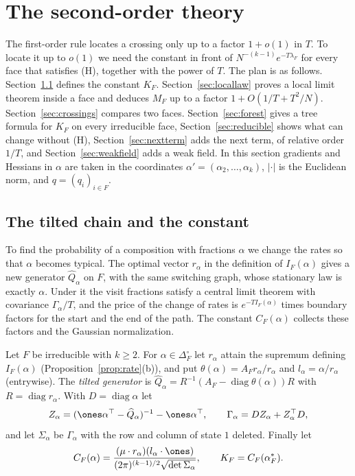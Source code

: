 \section{The second-order theory}\label{sec:secondorder}

The first-order rule locates a crossing only up to a factor $1+o(1)$ in $T$. To locate
it up to $o(1)$ we need the constant in front of $N^{-(k-1)}e^{-T\lambda_F}$ for
every face that satisfies (H), together with the power of $T$. The plan is as
follows. Section~\ref{sec:tilt} defines the constant $K_F$.
Section~\ref{sec:locallaw} proves a local limit theorem inside a face and
deduces $M_F$ up to a factor $1+O(1/T+T^2/N)$. Section~\ref{sec:crossings}
compares two faces. Section~\ref{sec:forest} gives a tree formula for $K_F$ on every
irreducible face, Section~\ref{sec:reducible} shows what can change without (H),
Section~\ref{sec:nextterm} adds the next term, of relative order $1/T$, and
Section~\ref{sec:weakfield} adds a weak field. In
this section gradients and Hessians in $\alpha$ are taken in the coordinates
$\alpha'=(\alpha_2,\dots,\alpha_k)$, $|\cdot|$ is the Euclidean norm, and
$q=(q_i)_{i\in F}$.

\subsection{The tilted chain and the constant}\label{sec:tilt}

To find the probability of a composition with fractions $\alpha$ we change the
rates so that $\alpha$ becomes typical. The optimal vector $r_\alpha$ in the
definition of $I_F(\alpha)$ gives a new generator $\widehat Q_\alpha$ on $F$, with
the same switching graph, whose stationary law is exactly $\alpha$. Under it the
visit fractions satisfy a central limit theorem with covariance
$\Gamma_\alpha/T$, and the price of the change of rates is $e^{-TI_F(\alpha)}$
times boundary factors for the start and the end of the path. The constant
$C_F(\alpha)$ collects these factors and the Gaussian normalization.

\begin{definition}\label{def:tilt}
Let $F$ be irreducible with $k\ge2$. For
$\alpha\in\Delta_F^\circ$ let $r_\alpha$ attain the supremum defining
$I_F(\alpha)$ (Proposition~\ref{prop:rate}(b)), and put
$\theta(\alpha)=A_Fr_\alpha/r_\alpha$ and $l_\alpha=\alpha/r_\alpha$
(entrywise). The \emph{tilted generator} is
$\widehat Q_\alpha=R^{-1}(A_F-\operatorname{diag}\theta(\alpha))R$ with
$R=\operatorname{diag}r_\alpha$. With $D=\operatorname{diag}\alpha$ let
\[
Z_\alpha=(\ones\alpha^\top-\widehat Q_\alpha)^{-1}-\ones\alpha^\top,
\qquad\Gamma_\alpha=DZ_\alpha+Z_\alpha^\top D,
\]
and let $\Sigma_\alpha$ be $\Gamma_\alpha$ with the row and column of state
$1$ deleted. Finally let
\[
C_F(\alpha)=\frac{(\mu\cdot r_\alpha)(l_\alpha\cdot\ones)}
{(2\pi)^{(k-1)/2}\sqrt{\det\Sigma_\alpha}},\qquad K_F=C_F(\alpha^*_F).
\]
\end{definition}

